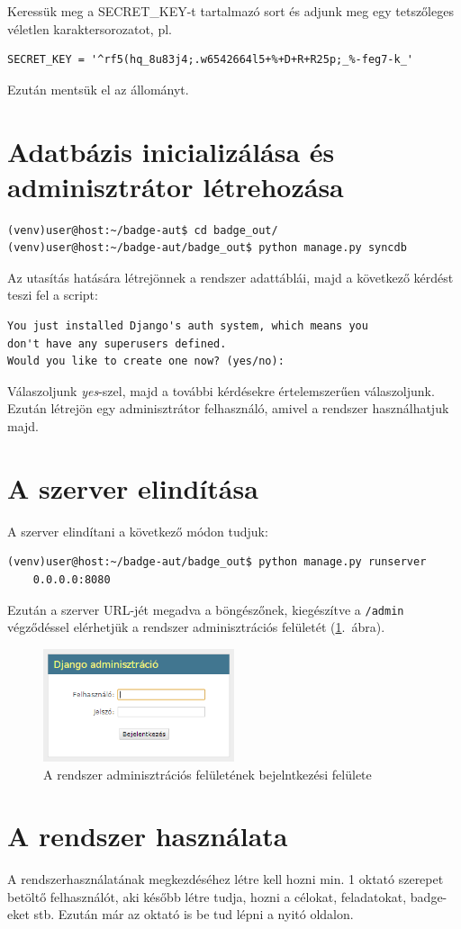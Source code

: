 \documentclass[a4paper,10pt,titlepage]{article}
\begin{document}
Keressük meg a SECRET\_KEY-t tartalmazó sort és adjunk meg egy tetszőleges véletlen karaktersorozatot, pl.

\begin{verbatim}
SECRET_KEY = '^rf5(hq_8u83j4;.w6542664l5+%+D+R+R25p;_%-feg7-k_'
\end{verbatim}

Ezután mentsük el az állományt.

\section{Adatbázis inicializálása és adminisztrátor létrehozása}

\begin{verbatim}
(venv)user@host:~/badge-aut$ cd badge_out/
(venv)user@host:~/badge-aut/badge_out$ python manage.py syncdb
\end{verbatim}

Az utasítás hatására létrejönnek a rendszer adattáblái, majd a következő kérdést teszi fel a script:

\begin{verbatim}
You just installed Django's auth system, which means you 
don't have any superusers defined.
Would you like to create one now? (yes/no):
\end{verbatim}

Válaszoljunk \textit{yes}-szel, majd a további kérdésekre értelemszerűen válaszoljunk. Ezután létrejön egy adminisztrátor felhasználó, amivel a rendszer használhatjuk majd.

\section{A szerver elindítása}

A szerver elindítani a következő módon tudjuk:
\begin{verbatim}
(venv)user@host:~/badge-aut/badge_out$ python manage.py runserver 
    0.0.0.0:8080
\end{verbatim}

Ezután a szerver URL-jét megadva a böngészőnek, kiegészítve a \texttt{/admin} végződéssel elérhetjük a rendszer adminisztrációs felületét (\ref{fig:django_admin}.~ábra).

\begin{figure}[ht!]
\centering
\includegraphics[width=0.50\textwidth]{figures/django_admin.png}
\caption{A rendszer adminisztrációs felületének bejelntkezési felülete \label{fig:django_admin}}
\end{figure}

\section{A rendszer használata}

A rendszerhasználatának megkezdéséhez létre kell hozni min. 1 oktató szerepet betöltő felhasználót, aki később létre tudja, hozni a célokat, feladatokat, badge-eket stb. Ezután már az oktató is be tud lépni a nyitó oldalon.
\end{document}
